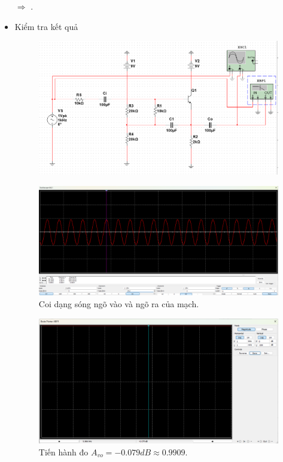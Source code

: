 \begin{itemize}[label=-]
	$\Rightarrow$ . 
	
	\item Kiểm tra kết quả
	
	\begin{figure}[H]
		\centering
		\includegraphics[width=.8\linewidth]{./my-chapters/my-images/Question4/b_GV_test.png}
	\end{figure}
	
	\begin{figure}[H]
		\centering
		\includegraphics[width=.8\linewidth]{./my-chapters/my-images/Question4/b_Avo_wave.png}
		\caption{Coi dạng sóng ngõ vào và ngõ ra của mạch.}
	\end{figure}
	
	\begin{figure}[H]
		\centering
		\includegraphics[width=.8\linewidth]{./my-chapters/my-images/Question4/b_Avo_bode.png}
		\caption{Tiến hành đo $A_{vo} = -0.079dB \approx 0.9909$.}
	\end{figure}
	

\end{itemize}
